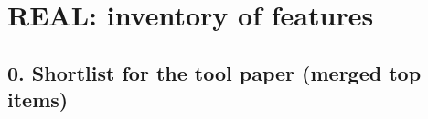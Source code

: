 %

\providecommand{\tagnew}{\textsc{[new]}}
\providecommand{\tagparent}[1]{\textsc{[parent: #1]}}
\providecommand{\tagstudy}{\textsc{[study]}}
\providecommand{\taginfra}{\textsc{[infra]}}
\providecommand{\ev}[1]{{\footnotesize\,(#1)}}

\section*{REAL: inventory of features}

\subsection*{0. Shortlist for the tool paper (merged top items)}

